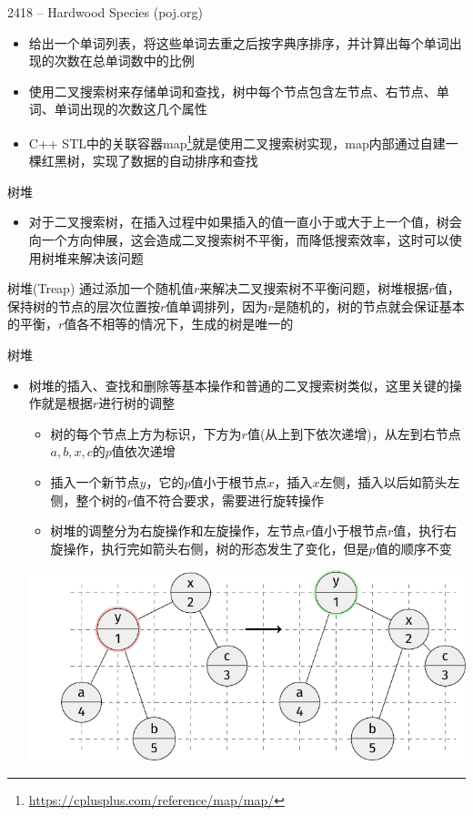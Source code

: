 \begin{frame}{2418 -- Hardwood Species (poj.org)}
    \begin{itemize}
        \item 给出一个单词列表，将这些单词去重之后按字典序排序，并计算出每个单词出现的次数在总单词数中的比例
        \vfill
        \item 使用二叉搜索树来存储单词和查找，树中每个节点包含左节点、右节点、单词、单词出现的次数这几个属性
        \vfill
        \item C++ STL中的关联容器map\footnote{\url{https://cplusplus.com/reference/map/map/}}就是使用二叉搜索树实现，map内部通过自建一棵红黑树，实现了数据的自动排序和查找
    \end{itemize}
\end{frame}
\begin{frame}{树堆}
    \begin{itemize}
        \item  对于二叉搜索树，在插入过程中如果插入的值一直小于或大于上一个值，树会向一个方向伸展，这会造成二叉搜索树不平衡，而降低搜索效率，这时可以使用树堆来解决该问题
    \end{itemize}
    \vfill
    \begin{block}{树堆(Treap)}
        通过添加一个随机值$r$来解决二叉搜索树不平衡问题，树堆根据$r$值，保持树的节点的层次位置按$r$值单调排列，因为$r$是随机的，树的节点就会保证基本的平衡，$r$值各不相等的情况下，生成的树是唯一的
    \end{block}
\end{frame}
\begin{frame}{树堆}
    \begin{itemize}
        \item 树堆的插入、查找和删除等基本操作和普通的二叉搜索树类似，这里关键的操作就是根据$r$进行树的调整
        \begin{itemize}
            \item 树的每个节点上方为标识，下方为$r$值(从上到下依次递增)，从左到右节点$a,b,x,c$的$p$值依次递增
            \item 插入一个新节点$y$，它的$p$值小于根节点$x$，插入$x$左侧，插入以后如箭头左侧，整个树的$r$值不符合要求，需要进行旋转操作
            \item 树堆的调整分为右旋操作和左旋操作，左节点$r$值小于根节点$r$值，执行右旋操作，执行完如箭头右侧，树的形态发生了变化，但是$p$值的顺序不变
        \end{itemize}
        \includegraphics[scale=.6,center]{fig/6-6.pdf}
    \end{itemize}
\end{frame}
